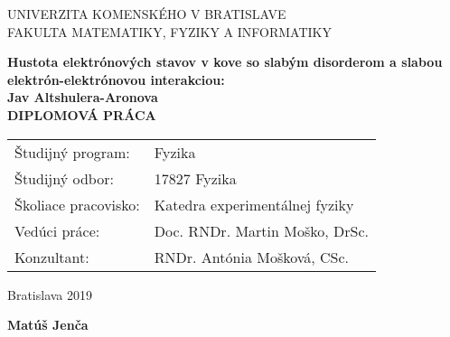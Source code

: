 \newpage
\thispagestyle{empty}
\begin{center}
{\large UNIVERZITA KOMENSKÉHO V BRATISLAVE \\
FAKULTA MATEMATIKY, FYZIKY A INFORMATIKY}
\end{center}


\vspace{5cm}
\begin{center}
{\large \bf Hustota elektrónových stavov v kove so slabým disorderom a slabou elektrón-elektrónovou interakciou:\\ Jav Altshulera-Aronova\\
\vspace{3cm}
DIPLOMOVÁ PRÁCA}
\end{center}

\vfill
\begin{flushleft}
\begin{tabular}{ll}
Študijný program: & Fyzika \\
Študijný odbor: & 17827 Fyzika \\
Školiace pracovisko: & Katedra experimentálnej fyziky \\
Vedúci práce: & Doc. RNDr. Martin Moško, DrSc. \\
Konzultant: & RNDr. Antónia Mošková, CSc. \\
\end{tabular}
\end{flushleft}

\vfill
%
\begin{multicols}{2}
\begin{flushleft} Bratislava 2019 \end{flushleft}
\begin{flushright} {\bf Matúš Jenča} \end{flushright}
\end{multicols}

